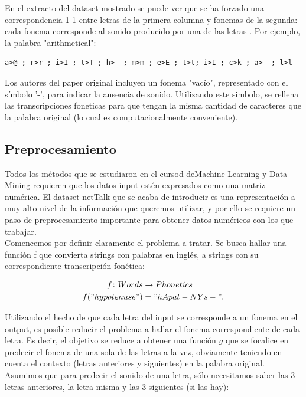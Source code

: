 \documentclass[paper=a4, fontsize=11pt]{scrartcl} %
\numberwithin{equation}{section} %
\numberwithin{figure}{section} %
\numberwithin{table}{section} %
\begin{document}
En el extracto del dataset mostrado se puede ver que se ha forzado una correspondencia 1-1 entre letras de la primera columna y fonemas de la segunda: cada fonema corresponde al sonido producido por una de las letras . Por ejemplo, la palabra "arithmetical": 

\begin{center}

\begin{BVerbatim}
a>@ ; r>r ; i>I ; t>T ; h>- ; m>m ; e>E ; t>t; i>I ; c>k ; a>- ; l>l               
\end{BVerbatim}

\end{center}

Los autores del paper original incluyen un fonema "vacío", representado con el símbolo '-', para indicar la ausencia de sonido. Utilizando este simbolo, se rellena las transcripciones foneticas para que tengan la misma cantidad de caracteres que la palabra original (lo cual es computacionalmente conveniente).



\subsection{Preprocesamiento}

Todos los métodos que se estudiaron en el cursod deMachine Learning y Data Mining requieren que los datos input estén expresados como una matriz numérica. El dataset netTalk que se acaba de introducir es una representación a muy alto nivel de la información que queremos utilizar, y por ello se requiere un paso de preprocesamiento importante para obtener datos numéricos con los que trabajar. \\
\newpage
Comencemos por definir claramente el problema a tratar. Se busca hallar una función f que convierta strings con palabras en inglés, a strings con su correspondiente transcripción fonética:

\begin{align*}
  f \colon Words &\to Phonetics \\
  f("hypotenuse") &= "hApat-NYs-".
\end{align*}

Utilizando el hecho de que cada letra del input se corresponde a un fonema en el output, es posible reducir el problema a hallar el fonema correspondiente de cada letra. Es decir, el objetivo se reduce a obtener una función $g$ que se focalice en predecir el fonema de una sola de las letras a la vez, obviamente teniendo en cuenta el contexto (letras anteriores y siguientes) en la palabra original. Asumimos que para predecir el sonido de una letra, sólo necesitamos saber las 3 letras anteriores, la letra misma y las 3 siguientes (si las hay):
\end{document}
